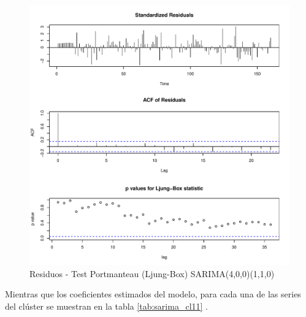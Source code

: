 \documentclass[12pt,oneside]{book}\usepackage[]{graphicx}\usepackage[]{color}
\makeatletter
\def\maxwidth{ %
  \ifdim\Gin@nat@width>\linewidth
    \linewidth
  \else
    \Gin@nat@width
  \fi
}
\newenvironment{knitrout}{}{} %
\theoremstyle{definition} %
\makeatother
\begin{document}
\begin{knitrout}
\color{fgcolor}\begin{figure}[h]

{\centering \includegraphics[width=\maxwidth]{figure/unnamed-chunk-75-1} 

}

\caption[Residuos - Test Portmanteau (Ljung-Box) SARIMA(4,0,0)(1,1,0)]{Residuos - Test Portmanteau (Ljung-Box) SARIMA(4,0,0)(1,1,0)}\label{fig:unnamed-chunk-75}
\end{figure}


\end{knitrout}


Mientras que los coeficientes estimados del modelo, para cada una de las series del clúster se muestran en la tabla \ref{tab:sarima_cl11} .
\end{document}
